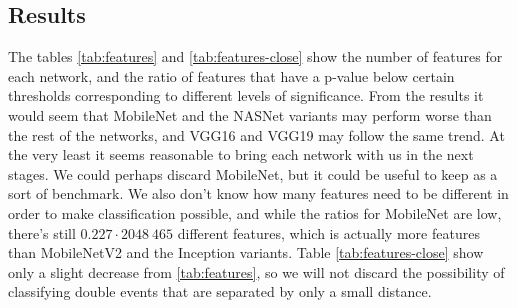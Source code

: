 \subsection{Results}
The tables \ref{tab:features} and \ref{tab:features-close} show the number of features for each network,
and the ratio of features that have a p-value below certain thresholds corresponding to different levels
of significance. From the results it would seem that MobileNet and the NASNet variants may perform worse
than the rest of the networks, and VGG16 and VGG19 may follow the same trend. At the very least it seems
reasonable to bring each network with us in the next stages. We could perhaps discard MobileNet, but it
could be useful to keep as a sort of benchmark. We also don't know how many features need to be different
in order to make classification possible, and while the ratios for MobileNet are low, there's still
$0.227\cdot 2048 ~ 465$ different features, which is actually more features than MobileNetV2 and the Inception 
variants. Table \ref{tab:features-close} show only a slight decrease from \ref{tab:features}, so we will not
discard the possibility of classifying double events that are separated by only a small distance.
